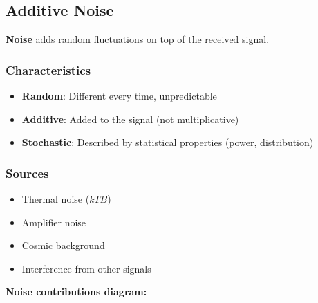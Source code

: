 \subsection{Additive Noise}\label{additive-noise}

\textbf{Noise} adds random fluctuations on top of the received signal.

\subsubsection{Characteristics}\label{characteristics-1}

\begin{itemize}
\tightlist
\item
  \textbf{Random}: Different every time, unpredictable
\item
  \textbf{Additive}: Added to the signal (not multiplicative)
\item
  \textbf{Stochastic}: Described by statistical properties (power,
  distribution)
\end{itemize}

\subsubsection{Sources}\label{sources-1}

\begin{itemize}
\item Thermal noise ($kTB$)
\item Amplifier noise
\item Cosmic background
\item Interference from other signals
\end{itemize}

\textbf{Noise contributions diagram:}

